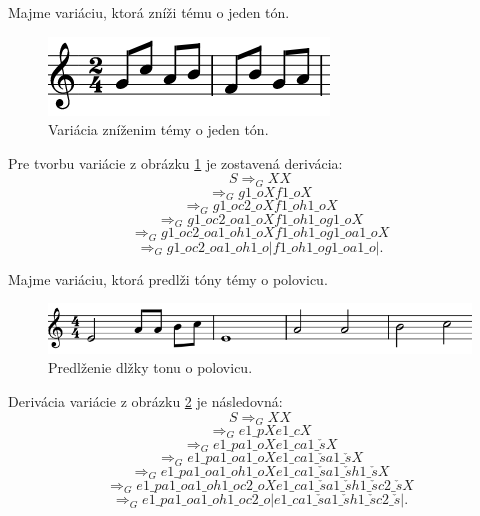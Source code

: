 \begin{example}
Majme variáciu, ktorá zníži tému o jeden tón.
\begin{figure}[H]
    \centering
    \includegraphics[scale=0.4]{thesis/obrazky-figures/seqdown.png}
    \caption{Variácia zníženim témy o jeden tón.}
    \label{fig:znizenievar}
    \end{figure}
    Pre tvorbu variácie z obrázku \ref{fig:znizenievar} je zostavená derivácia:
    $$ S \Rightarrow_G XX $$
    $$\Rightarrow_G  g1\_oXf1\_oX$$
    $$\Rightarrow_G  g1\_oc2\_oXf1\_oh1\_oX$$
    $$\Rightarrow_G  g1\_oc2\_oa1\_oXf1\_oh1\_og1\_oX$$
    $$\Rightarrow_G  g1\_oc2\_oa1\_oh1\_oXf1\_oh1\_og1\_oa1\_oX$$
    $$\Rightarrow_G  g1\_oc2\_oa1\_oh1\_o|f1\_oh1\_og1\_oa1\_o|.$$
\end{example}

\begin{example}
Majme variáciu, ktorá predlži tóny témy o polovicu.
\begin{figure}[H]
    \centering
    \includegraphics[scale=0.4]{thesis/obrazky-figures/augvar.png}
    \caption{Predlženie dlžky tonu o polovicu.}
    \label{fig:predlzenievar}
    \end{figure}
    Derivácia variácie z obrázku \ref{fig:predlzenievar} je následovná: 
    $$ S \Rightarrow_G XX $$
    $$\Rightarrow_G e1\_pXe1\_cX $$
    $$\Rightarrow_G e1\_pa1\_oXe1\_ca1\_\check{s}X $$
    $$\Rightarrow_G e1\_pa1\_oa1\_oXe1\_ca1\_\check{s}a1\_\check{s}X $$
    $$\Rightarrow_G e1\_pa1\_oa1\_oh1\_oXe1\_ca1\_\check{s}a1\_\check{s}h1\_\check{s}X $$
    $$\Rightarrow_G e1\_pa1\_oa1\_oh1\_oc2\_oXe1\_ca1\_\check{s}a1\_\check{s}h1\_\check{s}c2\_\check{s}X $$
    $$\Rightarrow_G e1\_pa1\_oa1\_oh1\_oc2\_o|e1\_ca1\_\check{s}a1\_\check{s}h1\_\check{s}c2\_\check{s}|.$$
\end{example}

